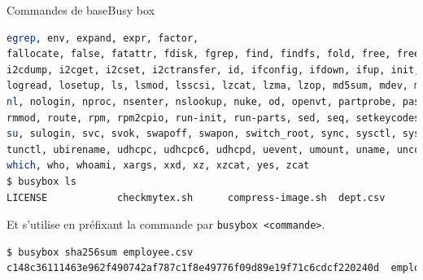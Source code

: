 \documentclass{beamer}
\begin{document}
    \begin{frame}[fragile]{Commandes de base}{Busy box}
        \begin{lstlisting}[language=bash,basicstyle=\tiny\ttfamily]
egrep, env, expand, expr, factor,
fallocate, false, fatattr, fdisk, fgrep, find, findfs, fold, free, freeramdisk, fsfreeze, fstrim, ftpget, ftpput, getopt, getty, grep, groups, gunzip, gzip, halt, head, hexdump, hostid, hostname, httpd, hwclock, i2cdetect,
i2cdump, i2cget, i2cset, i2ctransfer, id, ifconfig, ifdown, ifup, init, insmod, ionice, ip, ipcalc, kill, killall, klogd, last, less, link, linux32, linux64, linuxrc, ln, loadfont, loadkmap, logger, login, logname,
logread, losetup, ls, lsmod, lsscsi, lzcat, lzma, lzop, md5sum, mdev, microcom, mim, mkdir, mkdosfs, mke2fs, mkfifo, mknod, mkpasswd, mkswap, mktemp, modinfo, modprobe, more, mount, mt, mv, nameif, nbd-client, nc, netstat,
nl, nologin, nproc, nsenter, nslookup, nuke, od, openvt, partprobe, passwd, paste, patch, pidof, ping, ping6, pivot_root, poweroff, printf, ps, pwd, rdate, readlink, realpath, reboot, renice, reset, resume, rev, rm, rmdir,
rmmod, route, rpm, rpm2cpio, run-init, run-parts, sed, seq, setkeycodes, setpriv, setsid, sh, sha1sum, sha256sum, sha3sum, sha512sum, shred, shuf, sleep, sort, ssl_client, start-stop-daemon, stat, static-sh, strings, stty,
su, sulogin, svc, svok, swapoff, swapon, switch_root, sync, sysctl, syslogd, tac, tail, tar, taskset, tc, tee, telnet, telnetd, test, tftp, time, timeout, top, touch, tr, traceroute, traceroute6, true, truncate, ts, tty,
tunctl, ubirename, udhcpc, udhcpc6, udhcpd, uevent, umount, uname, uncompress, unexpand, uniq, unix2dos, unlink, unlzma, unshare, unxz, unzip, uptime, usleep, uudecode, uuencode, vconfig, vi, w, watch, watchdog, wc, wget,
which, who, whoami, xargs, xxd, xz, xzcat, yes, zcat
$ busybox ls
LICENSE            checkmytex.sh      compress-image.sh  dept.csv           employee.csv       sqlite-hr.sh       venv
        \end{lstlisting}
        Et s'utilise en préfixant la commande par \lstinline{busybox <commande>}.
        \begin{lstlisting}[language=bash,basicstyle=\tiny\ttfamily]
$ busybox sha256sum employee.csv
c148c36111463e962f490742af787c1f8e49776f09d89e19f71c6cdcf220240d  employee.csv
        \end{lstlisting}
    \end{frame}
\end{document}
